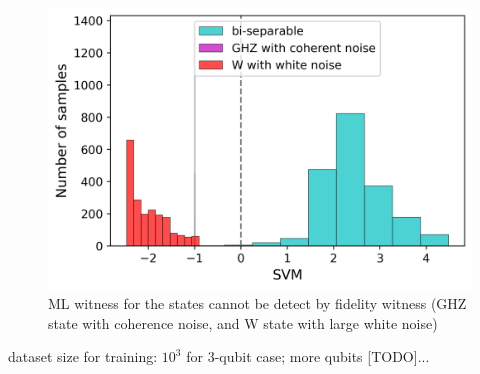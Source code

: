 \documentclass[
aps,
pra,
twocolumn,
floatfix,
]{revtex4-2}
\theoremstyle{plain}
\theoremstyle{definition}
\begin{document}
\begin{figure}[!ht]
	\centering
		\includegraphics[width=.9\linewidth]{./Code/three_qubit_hist_ML.png}
	\caption{ML witness for the states cannot be detect by fidelity witness (GHZ state with coherence noise, and W state with large white noise)}
	\label{fig:ml_compare}
\end{figure}

dataset size for training: $10^3$ for 3-qubit case; more qubits [TODO]...
\end{document}
